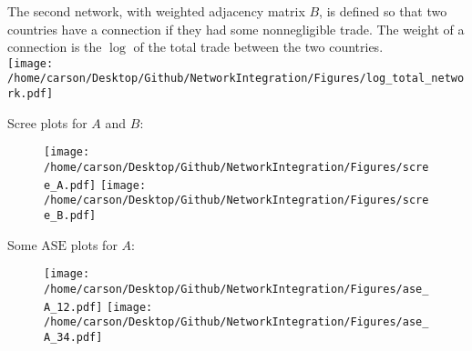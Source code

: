 \documentclass[notheorems]{beamer}
\theoremstyle{definition}
\begin{document}
\begin{frame}
The second network, with weighted adjacency matrix $B$, is defined so that two countries have a connection if they had some nonnegligible trade. The weight of a connection is the $\log$ of the total trade between the two countries. \\
\texttt{[image: /home/carson/Desktop/Github/NetworkIntegration/Figures/log\_total\_network.pdf]}
\end{frame}





















\begin{frame}
Scree plots for $A$ and $B$:\\

\begin{figure}
   \texttt{[image: /home/carson/Desktop/Github/NetworkIntegration/Figures/scree\_A.pdf]}
   \hfill
   \texttt{[image: /home/carson/Desktop/Github/NetworkIntegration/Figures/scree\_B.pdf]}
\end{figure}
\end{frame}



















\begin{frame}
Some $\text{ASE}$ plots for $A$:
\begin{figure}
   \texttt{[image: /home/carson/Desktop/Github/NetworkIntegration/Figures/ase\_A\_12.pdf]}
   \hfill
   \texttt{[image: /home/carson/Desktop/Github/NetworkIntegration/Figures/ase\_A\_34.pdf]}
\end{figure}
\end{frame}
\end{document}
